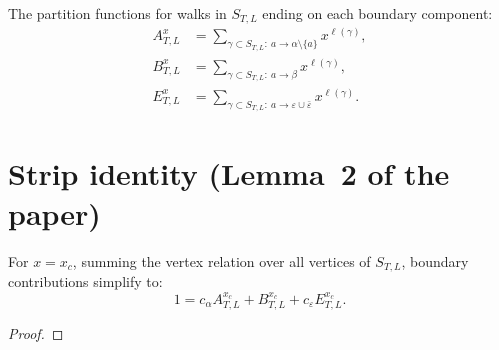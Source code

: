 \begin{definition}\label{def:ABE}
\leanok
{}
  The partition functions for walks in $S_{T,L}$ ending on each boundary component:
  \begin{align*}
    A_{T,L}^x &= \sum_{\gamma \subset S_{T,L}:\ a \to \alpha\setminus\{a\}} x^{\ell(\gamma)}, \\
    B_{T,L}^x &= \sum_{\gamma \subset S_{T,L}:\ a \to \beta} x^{\ell(\gamma)}, \\
    E_{T,L}^x &= \sum_{\gamma \subset S_{T,L}:\ a \to \varepsilon\cup\bar\varepsilon} x^{\ell(\gamma)}.
  \end{align*}
\end{definition}


\section{Strip identity (Lemma~2 of the paper)}

\begin{theorem}\label{thm:strip_identity_abs}
\leanok
{}
  For $x = x_c$, summing the vertex relation over all vertices of $S_{T,L}$,
  boundary contributions simplify to:
  \[ 1 = c_\alpha A_{T,L}^{x_c} + B_{T,L}^{x_c} + c_\varepsilon E_{T,L}^{x_c}. \]
\end{theorem}
\begin{proof}
\leanok
\end{proof}

